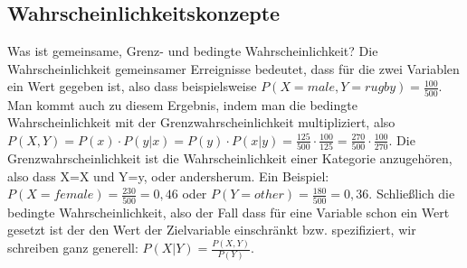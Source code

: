 \documentclass[letterpaper, titlepage]{article}
\begin{document}
\subsection{Wahrscheinlichkeitskonzepte}\label{Wahrscheinlichkeitskonzepte}
Was ist gemeinsame, Grenz- und bedingte Wahrscheinlichkeit? Die Wahrscheinlichkeit gemeinsamer Erreignisse bedeutet, dass für die zwei Variablen ein Wert gegeben ist, also dass beispielsweise $P(X=male, Y=rugby)=\frac{100}{500}$. Man kommt auch zu diesem Ergebnis, indem man die bedingte Wahrscheinlichkeit mit der  Grenzwahrscheinlichkeit multipliziert, also $P(X,Y)=P(x)\cdot P(y|x)=P(y)\cdot P(x|y)=\frac{125}{500}\cdot \frac{100}{125}=\frac{270}{500}\cdot \frac{100}{270}$. Die  Grenzwahrscheinlichkeit ist die Wahrscheinlichkeit einer Kategorie anzugehören, also dass X=X und Y=y, oder andersherum. Ein Beispiel: $P(X=female)=\frac{230}{500}=0,46$ oder $P(Y=other)=\frac{180}{500}=0,36$. Schließlich die bedingte Wahrscheinlichkeit, also der Fall dass für eine Variable schon ein Wert gesetzt ist der den Wert der Zielvariable einschränkt bzw. spezifiziert, wir schreiben ganz generell: $P(X|Y)=\frac{P(X,Y)}{P(Y)}$.
\end{document}
